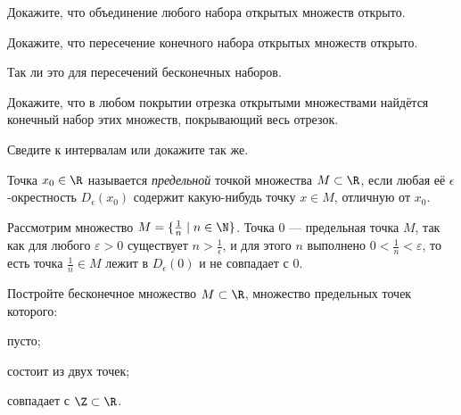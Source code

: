 \documentclass[a4paper, 12pt, num=2729, date=01.09.2020]{listok}
\begin{document}
\begin{problem}
    Докажите, что объединение любого набора открытых множеств открыто.
\end{problem}

\begin{problem}
\begin{probparts}
    \item Докажите, что пересечение конечного набора открытых множеств открыто.
    \item Так ли это для пересечений бесконечных наборов.
\end{probparts}
\end{problem}

\begin{problem}
    Докажите, что в любом покрытии отрезка открытыми множествами найдётся конечный набор этих множеств, покрывающий весь отрезок.
\end{problem}
\begin{note}
    Сведите к интервалам или докажите так же.
\end{note}


\begin{definition}
    Точка $x_0 \in \R$ называется \textit{предельной} точкой множества $M \subset \R$,
    если любая её $\epsilon$-окрестность $D_{\epsilon}(x_0)$ содержит какую-нибудь точку $x \in M$, отличную от $x_0$.
\end{definition}

\begin{example*}
    Рассмотрим множество $M = \{\frac1n \mid n \in \N\}$. Точка $0$ --- предельная точка $M$, так как для любого $\varepsilon > 0$ существует $n > \frac1\epsilon$, и для этого $n$ выполнено $0 < \frac1n < \varepsilon$, то есть точка $\frac1n \in M$ лежит в $D_{\epsilon}(0)$ и не совпадает с $0$. 
\end{example*}

\begin{problem}
    Постройте бесконечное множество $M \subset \R$, множество предельных точек которого:
    \begin{probparts}
        \item пусто;
        \item состоит из двух точек;
        \item совпадает с $\Z \subset \R$.
    \end{probparts}
\end{problem}
\end{document}
